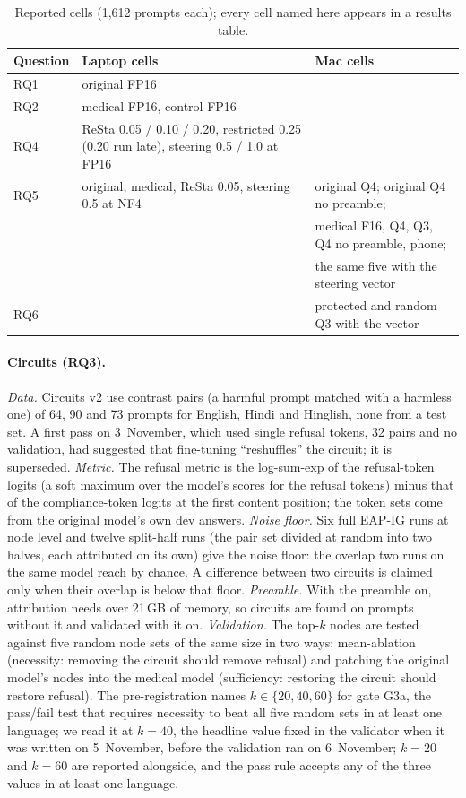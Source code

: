 \begin{table}[tbp]
\centering
\caption{Reported cells (1,612 prompts each); every cell named here appears in a results table.}\label{tab:cells}
\footnotesize
\begin{tabular}{>{\raggedright\arraybackslash}p{2.1cm}>{\raggedright\arraybackslash}p{4.55cm}>{\raggedright\arraybackslash}p{4.55cm}}
\toprule
Question & Laptop cells & Mac cells \\
\midrule
RQ1 & original FP16 & \\
RQ2 & medical FP16, control FP16 & \\
RQ4 & ReSta 0.05 / 0.10 / 0.20, restricted 0.25 (0.20 run late), steering 0.5 / 1.0 at FP16 & \\
RQ5 & original, medical, ReSta 0.05, steering 0.5 at NF4 & original Q4; original Q4 no preamble; \\
& & medical F16, Q4, Q3, Q4 no preamble, phone; \\
& & the same five with the steering vector \\
RQ6 & & protected and random Q3 with the vector \\
\bottomrule
\end{tabular}
\end{table}

\paragraph{Circuits (RQ3).} \emph{Data.} Circuits v2 use contrast pairs (a harmful prompt matched with a harmless one) of 64, 90 and 73 prompts for English, Hindi and Hinglish, none from a test set. A first pass on 3~November, which used single refusal tokens, 32 pairs and no validation, had suggested that fine-tuning ``reshuffles'' the circuit; it is superseded. \emph{Metric.} The refusal metric is the log-sum-exp of the refusal-token logits (a soft maximum over the model's scores for the refusal tokens) minus that of the compliance-token logits at the first content position; the token sets come from the original model's own dev answers. \emph{Noise floor.} Six full EAP-IG runs at node level and twelve split-half runs (the pair set divided at random into two halves, each attributed on its own) give the noise floor: the overlap two runs on the same model reach by chance. A difference between two circuits is claimed only when their overlap is below that floor. \emph{Preamble.} With the preamble on, attribution needs over 21\,GB of memory, so circuits are found on prompts without it and validated with it on. \emph{Validation.} The top-$k$ nodes are tested against five random node sets of the same size in two ways: mean-ablation (necessity: removing the circuit should remove refusal) and patching the original model's nodes into the medical model (sufficiency: restoring the circuit should restore refusal). The pre-registration names $k \in \{20, 40, 60\}$ for gate G3a, the pass/fail test that requires necessity to beat all five random sets in at least one language; we read it at $k=40$, the headline value fixed in the validator when it was written on 5~November, before the validation ran on 6~November; $k=20$ and $k=60$ are reported alongside, and the pass rule accepts any of the three values in at least one language.

